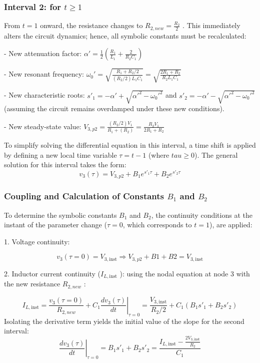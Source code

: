 \documentclass[energies,accept,oneauthor,pdftex]{Definitions/mdpi}
\begin{document}
\subsubsection*{Interval 2: for $t \ge 1$}

From $t = 1$ onward, the resistance changes to $R_{2,new} = \frac{R_2}{2}$ . This immediately alters the circuit dynamics; hence, all symbolic constants must be recalculated:

- New attenuation factor:
$\alpha'= \frac{1}{2}\left(\frac{R_1}{L_1}+\frac{2}{R_2C_1}\right)$

- New resonant frequency:
$\omega_0' = \sqrt{\frac{R_1+R_2/2}{(R_2/2)L_1C_1}}
 = \sqrt{\frac{2 R_1+R_2}{R_2L_1C_1}}$

- New characteristic roots:
$s'_1 = -\alpha' + \sqrt{\alpha'^2 - \omega_0'^2}$ and
$s'_2 = -\alpha' - \sqrt{\alpha'^2 - \omega_0'^2}$
(assuming the circuit remains overdamped under these new conditions).

- New steady-state value:
$V_{3,p2} = \frac{(R_2/2) V_1}{R_1+(R_2)}
= \frac{R_2 V_1}{2R_1+R_2}$

To simplify solving the differential equation in this interval, a time shift is applied by defining a new local time variable
$\tau = t - 1$ (where $tau \ge $0).
The general solution for this interval takes the form:
\[
v_3(\tau ) = V_{3,p2} + B_1 e^{s'_1\tau} + B_2 e^{s'_2\tau}
\]

\subsubsection*{Coupling and Calculation of Constants $B_1$ and $B_2$}

\medskip

To determine the symbolic constants $B_1$ and $B_2$, the continuity conditions at the instant of the parameter change ($\tau = 0$, which corresponds to $t = 1$), are applied:

1. Voltage continuity:

\[
v_3(\tau=0) = V_{3,\mathrm{inst}} \Rightarrow
V_{3,p2} + B1 + B2 = V_{3,\mathrm{inst}}
\]

2. Inductor current continuity ($I_{L,\mathrm{inst}}$ ): using the nodal equation at node 3 with the new resistance $R_{2,new}$ :

\[
I_{L,\mathrm{inst}} = \frac{v_3(\tau=0)}{R_{2,new}}
+ C_1\left.\frac{d v_3(\tau)}{dt}\right|_{\tau=0} =
\frac{V_{3,\mathrm{inst}}}{R_2/2} + C_1 (B_1 s'_1 + B_2 s'_2)
\]
Isolating the derivative term yields the initial value of the slope for the second interval:
\[
\left.\frac{d v_3(\tau)}{dt}\right|_{\tau=0}= B_1 s'_1 + B_2 s'_2
= \frac{I_{L,\mathrm{inst}}-\frac{2V_{3,\mathrm{inst}}}{R_2}}{C_1}
\]
\end{document}
